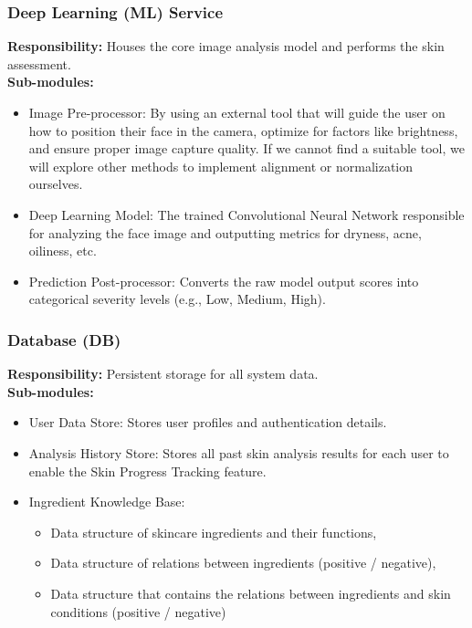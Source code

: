 \documentclass[12pt,a4paper]{article}
\begin{document}
\subsubsection{Deep Learning (ML) Service}
\textbf{Responsibility:} Houses the core image analysis model and performs the skin assessment.\\
\textbf{Sub-modules:}
\begin{itemize}
    \item Image Pre-processor: By using an external tool that will guide the user on how to position their face in the camera, optimize for factors like brightness, and ensure proper image capture quality. If we cannot find a suitable tool, we will explore other methods to implement alignment or normalization ourselves.
    \item Deep Learning Model: The trained Convolutional Neural Network responsible for analyzing the face image and outputting metrics for dryness, acne, oiliness, etc.
    \item Prediction Post-processor: Converts the raw model output scores into categorical severity levels (e.g., Low, Medium, High).
\end{itemize}

\subsubsection{Database (DB)}
\textbf{Responsibility:} Persistent storage for all system data.\\
\textbf{Sub-modules:}
\begin{itemize}
    \item User Data Store: Stores user profiles and authentication details.
    \item Analysis History Store: Stores all past skin analysis results for each user to enable the Skin Progress Tracking feature.
    \item Ingredient Knowledge Base:
    \begin{itemize}
        \item Data structure of skincare ingredients and their functions,
        \item Data structure of relations between ingredients (positive / negative),
        \item Data structure that contains the relations between ingredients and skin conditions (positive / negative)
    \end{itemize}
\end{itemize}
\end{document}

